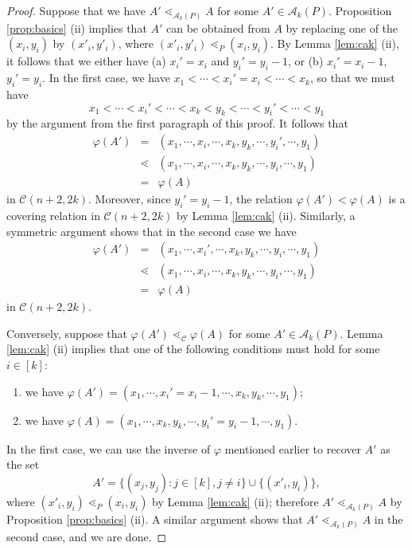\documentclass[11pt]{amsart}
\theoremstyle{plain}
\theoremstyle{definition}
\theoremstyle{remark}
\numberwithin{equation}{section}
\newcommand{\cala}{\mathcal{A}}
\newcommand{\calc}{\mathcal{C}}
\newcommand{\akp}{\mathcal{A}_k(P)}
\begin{document}
\begin{proof}
Suppose that we have $A' \lessdot_{\cala_k(P)} A$ for some $A'\in \akp$.
Proposition \ref{prop:basics} (ii) implies that $A'$ can be obtained from $A$ by
replacing one of the $(x_i, y_i)$ by $(x'_i, y'_i)$, where $(x'_i, y'_i)
\lessdot_P (x_i, y_i)$. By Lemma \ref{lem:cak} (ii), it follows that we
either have (a) $x_i'=x_i$ and $y_i'=y_i-1$, or (b) $x_i'=x_i-1$, $y_i'=y_i$.
In the first case, we have $x_1<\cdots< x_i'=x_i< \cdots<x_k$, so that we must
have 
\[ x_1<\cdots<x_i'<\cdots< x_k<y_k<\cdots <y_i'<\cdots<y_1 \] 
by the argument from the first paragraph of this proof. It follows that 
\begin{eqnarray*} 
\varphi(A')&=&(x_1,\cdots,x_i, \cdots,x_k, y_k, \cdots,y_i', \cdots,  y_1) \\ 
      &\lessdot&(x_1,\cdots,x_i, \cdots,x_k, y_k, \cdots,y_i, \cdots, y_1)\\ 
      &=&\varphi(A) \end{eqnarray*} 
in $\calc(n+2,2k)$. Moreover, since $y_i'=y_i-1$, the relation
$\varphi(A')<\varphi(A)$ is a covering relation in $\calc(n+2,2k)$ by Lemma
\ref{lem:cak} (ii).  Similarly, a symmetric argument shows that in the second
case we have 
\begin{eqnarray*} 
\varphi(A')&=&(x_1,\cdots,x_i', \cdots,x_k,y_k, \cdots,y_i, \cdots,  y_1) \\ 
&\lessdot&(x_1,\cdots,x_i, \cdots,x_k, y_k, \cdots,y_i, \cdots,  y_1)\\ 
&=&\varphi(A) 
\end{eqnarray*} 
in $\calc(n+2,2k)$. 

Conversely, suppose that $\varphi(A')\lessdot_\calc \varphi(A)$ for some $A'\in
\akp$.  Lemma \ref{lem:cak} (ii) implies that one of the following conditions
must hold for some $i\in [k]$:

\begin{enumerate}
\item we have $\varphi(A')=(x_1, \cdots, x_i'=x_i-1, \cdots, x_k,y_k,\cdots, y_1)$; 
\item we have $\varphi(A)=(x_1, \cdots, x_k,y_k,\cdots,y_i'=y_i-1,\cdots, y_1)$. 
\end{enumerate} 

In the first case, we can use the inverse of $\varphi$ mentioned earlier to
recover $A'$ as the set $$ A'=\{(x_j,y_j):j\in [k], j\neq i\}\cup\{(x'_i,y_i)\}
,$$ where $(x'_i,y_i)\lessdot_P (x_i,y_i)$ by Lemma \ref{lem:cak} (ii); therefore $A'\lessdot_{\akp} A$ by Proposition \ref{prop:basics} (ii).  A
similar argument shows that $A'\lessdot_{\akp} A$ in the second case, and we are
done.
 \end{proof}
\end{document}
